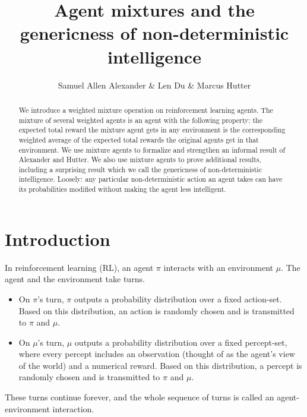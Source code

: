 \documentclass{article}
\begin{document}
\title{Agent mixtures and the genericness of non-deterministic intelligence}
\author{Samuel Allen Alexander \& Len Du \& Marcus Hutter}


\maketitle

\begin{abstract}
    We introduce a weighted mixture operation on
    reinforcement learning agents. The mixture of several weighted agents is
    an agent with the
    following property: the expected total reward the mixture agent
    gets in any environment is the corresponding weighted average
    of the expected total rewards the original agents get in that
    environment. We use mixture agents to formalize and
    strengthen an informal result of Alexander and Hutter. We also use mixture
    agents to prove additional results, including a surprising result
    which we call the genericness of non-deterministic intelligence. Loosely:
    any particular non-deterministic action an agent takes
    can have its probabilities modified without making the agent less
    intelligent.
\end{abstract}

\section{Introduction}

In reinforcement learning (RL), an agent $\pi$ interacts with an environment $\mu$.
The agent and the environment take turns.
\begin{itemize}
\item
On $\pi$'s turn, $\pi$
outputs a probability distribution over a fixed action-set.
Based on this distribution, an action is randomly chosen
and is transmitted to $\pi$ and $\mu$.
\item
On $\mu$'s turn, $\mu$
outputs a probability distribution over a fixed percept-set,
where every percept includes an observation (thought of as
the agent's view of the world) and a numerical reward.
Based on this distribution, a percept is randomly chosen and
is transmitted to $\pi$ and $\mu$.
\end{itemize}
These turns continue forever, and the whole sequence of turns
is called an agent-environment interaction.
\end{document}
